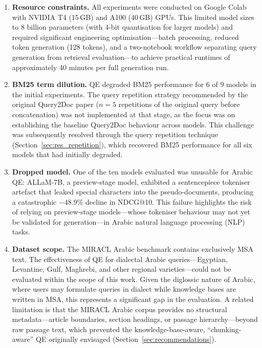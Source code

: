 \begin{enumerate}[label=\roman*.]
    \item \textbf{Resource constraints.} All experiments were conducted on Google Colab with NVIDIA T4 (15\,GB) and A100 (40\,GB) GPUs. This limited model sizes to 8 billion parameters (with 4-bit quantisation for larger models) and required significant engineering optimisation---batch processing, reduced token generation (128 tokens), and a two-notebook workflow separating query generation from retrieval evaluation---to achieve practical runtimes of approximately 40 minutes per full generation run.

    \item \textbf{BM25 term dilution.} QE degraded BM25 performance for 6 of 9 models in the initial experiments. The query repetition strategy recommended by the original Query2Doc paper \cite{wang_2023_query2doc} ($n=5$ repetitions of the original query before concatenation) was not implemented at that stage, as the focus was on establishing the baseline Query2Doc behaviour across models. This challenge was subsequently resolved through the query repetition technique (Section~\ref{sec:res_repetition}), which recovered BM25 performance for all six models that had initially degraded.

    \item \textbf{Dropped model.} One of the ten models evaluated was unusable for Arabic QE: ALLaM-7B, a preview-stage model, exhibited a sentencepiece tokeniser artefact that leaked special characters into the pseudo-documents, producing a catastrophic $-$48.9\% decline in NDCG@10. This failure highlights the risk of relying on preview-stage models---whose tokeniser behaviour may not yet be validated for generation---in Arabic natural language processing (NLP) tasks.

    \item \textbf{Dataset scope.} The MIRACL Arabic benchmark contains exclusively MSA text. The effectiveness of QE for dialectal Arabic queries---Egyptian, Levantine, Gulf, Maghrebi, and other regional varieties---could not be evaluated within the scope of this work. Given the diglossic nature of Arabic, where users may formulate queries in dialect while knowledge bases are written in MSA, this represents a significant gap in the evaluation. A related limitation is that the MIRACL Arabic corpus provides no structural metadata---article boundaries, section headings, or passage hierarchy---beyond raw passage text, which prevented the knowledge-base-aware, ``chunking-aware'' QE originally envisaged (Section~\ref{sec:recommendations}).


\end{enumerate}
